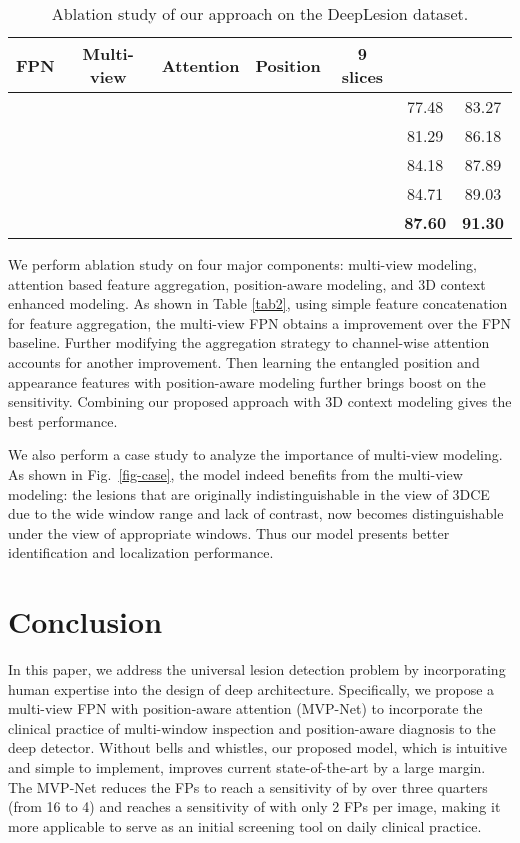 \documentclass[runningheads]{llncs}
\begin{document}
\begin{table}[!htbp]
    \caption{Ablation study of our approach on the DeepLesion dataset.}
    \label{tab2}
    \centering
    \footnotesize \setlength{\tabcolsep}{8pt}\renewcommand{\arraystretch}{1.2}\centering
        \label{tab:sample_2}
        \begin{tabular}{lcccc|cc}
        \toprule
            FPN & Multi-view & Attention & Position & 9 slices &  &  \\
            \hline
            \hline
             &  &  &  & & 77.48 & 83.27 \\
             &  && & & 81.29 & 86.18 \\
             &  & & & & 84.18 & 87.89 \\
             &  & &  & & 84.71 & 89.03 \\
             &  & &  &  & \textbf{87.60} & \textbf{91.30} \\
            \bottomrule
        \end{tabular}
\end{table}
We perform ablation study on four major components: multi-view modeling, attention based feature aggregation, position-aware modeling, and 3D context enhanced modeling. As shown in Table \ref{tab2}, using simple feature concatenation for feature aggregation, the multi-view FPN obtains a  improvement over the FPN baseline. Further modifying the aggregation strategy to channel-wise attention accounts for another  improvement. Then learning the entangled position and appearance features with position-aware modeling further brings  boost on the sensitivity. Combining our proposed approach with 3D context modeling gives the best performance.



We also perform a case study to analyze the importance of multi-view modeling. As shown in Fig.~\ref{fig-case}, the model indeed benefits from the multi-view modeling: the lesions that are originally indistinguishable in the view of 3DCE due to the wide window range and lack of contrast, now becomes distinguishable under the view of appropriate windows. Thus our model presents better identification and localization performance.




\section{Conclusion}
In this paper, we address the universal lesion detection problem by incorporating human expertise into the design of deep architecture. Specifically, 
we propose a multi-view FPN with position-aware attention (MVP-Net) to incorporate the clinical practice of multi-window inspection and position-aware diagnosis to the deep detector. Without bells and whistles, our proposed model, which is intuitive and simple to implement, improves current state-of-the-art by a large margin. The MVP-Net reduces the FPs to reach a sensitivity of  by over three quarters (from 16 to 4) and reaches a sensitivity of  with only 2 FPs per image, making it more applicable to serve as an initial screening tool on daily clinical practice.
\end{document}
